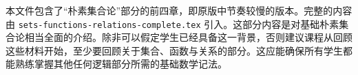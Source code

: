 \documentclass[../../include/open-logic-part]{subfiles}
\begin{document}

\begin{editorial}
  本文件包含了“朴素集合论”部分的前四章，即原版中节奏较慢的版本。完整的内容由 \verb|sets-functions-relations-complete.tex| 引入。这部分内容是对基础朴素集合论相当全面的介绍。除非可以假定学生已经具备这一背景，否则建议课程从回顾这些材料开始，至少要回顾关于集合、函数与关系的部分。这应能确保所有学生都能熟练掌握其他任何逻辑部分所需的基础数学记法。
\end{editorial}





\OLEndPartHook
\end{document}
